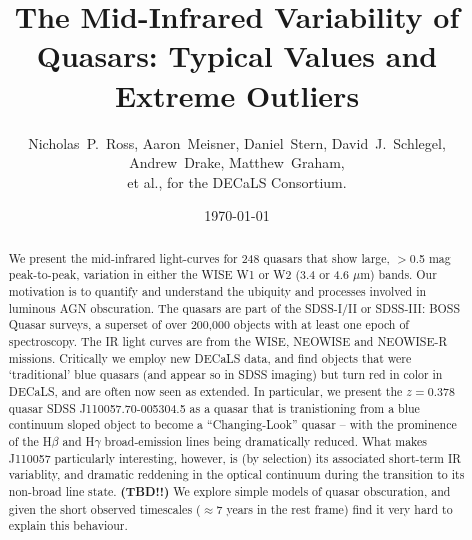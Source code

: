 \documentclass{emulateapj}
\begin{document}

\title{The Mid-Infrared Variability of Quasars: 
         Typical Values and Extreme Outliers
}
\author{
Nicholas~P.~Ross, 
Aaron~Meisner, 
Daniel~Stern,
David~J.~Schlegel,
Andrew~Drake, 
Matthew~Graham, \\
et al.,  
for the DECaLS Consortium. 
}


\date{\today}

\begin{abstract}
We present the mid-infrared light-curves for 248 quasars that show
large, $>$0.5 mag peak-to-peak, variation in either the WISE W1 or W2
(3.4 or 4.6 $\mu$m) bands. Our motivation is to quantify and
understand the ubiquity and processes involved in luminous AGN
obscuration.  The quasars are part of the SDSS-I/II or SDSS-III: BOSS
Quasar surveys, a superset of over 200,000 objects with at least one
epoch of spectroscopy. The IR light curves are from the WISE, NEOWISE
and NEOWISE-R missions.
Critically we employ new DECaLS data, and find objects that were
`traditional' blue quasars (and appear so in SDSS imaging) but turn
red in color in DECaLS, and are often now seen as extended.
In particular, we present the $z=0.378$ quasar SDSS
J110057.70-005304.5 as a quasar that is tranistioning from a blue
continuum sloped object to become a ``Changing-Look'' quasar -- with the
prominence of the H$\beta$ and H$\gamma$ broad-emission lines being
dramatically reduced. What makes J110057 particularly interesting,
however, is (by selection) its associated short-term IR variablity,
and dramatic reddening in the optical continuum during the transition
to its non-broad line state.
{\bf (TBD!!)} We explore simple models of quasar obscuration, and
given the short observed timescales ($\approx$7 years in the rest
frame) find it very hard to explain this behaviour.
\end{abstract}
\end{document}
